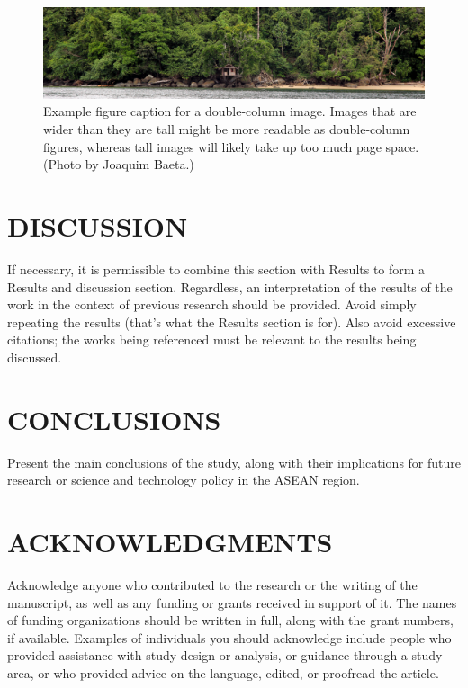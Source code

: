 \documentclass[twocolumn,twoside]{base/ajstd}
\begin{document}
\begin{figure}[!b]
	\centering
	\includegraphics[width=\linewidth]{figures/Figure2.jpg}
	\caption{Example figure caption for a double-column image. Images that are wider than they are tall might be more readable as double-column figures, whereas tall images will likely take up too much page space. (Photo by Joaquim Baeta.)}
	\label{fig:2}
\end{figure}

\section{DISCUSSION}

If necessary, it is permissible to combine this section with Results to form a Results and discussion section. Regardless, an interpretation of the results of the work in the context of previous research should be provided. Avoid simply repeating the results (that’s what the Results section is for). Also avoid excessive citations; the works being referenced must be relevant to the results being discussed.

\section{CONCLUSIONS}

Present the main conclusions of the study, along with their implications for future research or science and technology policy in the ASEAN region.

\section*{ACKNOWLEDGMENTS}

Acknowledge anyone who contributed to the research or the writing of the manuscript, as well as any funding or grants received in support of it. The names of funding organizations should be written in full, along with the grant numbers, if available. Examples of individuals you should acknowledge include people who provided assistance with study design or analysis, or guidance through a study area, or who provided advice on the language, edited, or proofread the article.
\end{document}
